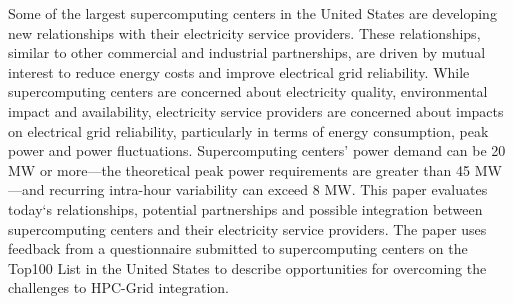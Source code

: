 Some of the largest supercomputing centers in the United States are developing 
new relationships with their electricity service providers. 
These relationships, similar to other commercial and industrial partnerships, are 
driven by mutual interest to reduce energy costs and improve electrical grid reliability.
While supercomputing centers are concerned about electricity quality, environmental 
impact and availability, electricity service providers are concerned about impacts
on electrical grid reliability, particularly in terms of energy consumption, peak power and power fluctuations.
Supercomputing centers' power demand can be 20 MW or more---the 
theoretical peak power requirements are greater than 45 MW---and recurring 
intra-hour variability can exceed 8 MW.
This paper evaluates today`s relationships, potential partnerships and possible 
integration between supercomputing centers and their electricity service providers.
The paper uses feedback from a questionnaire submitted to supercomputing centers 
on the Top100 List in the United States to describe opportunities for overcoming the 
challenges to HPC-Grid integration.

